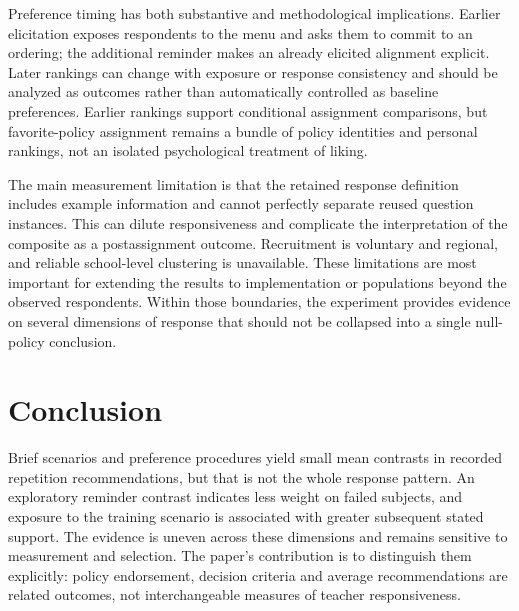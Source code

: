 Preference timing has both substantive and methodological implications. Earlier elicitation exposes respondents to the menu and asks them to commit to an ordering; the additional reminder makes an already elicited alignment explicit. Later rankings can change with exposure or response consistency and should be analyzed as outcomes rather than automatically controlled as baseline preferences. Earlier rankings support conditional assignment comparisons, but favorite-policy assignment remains a bundle of policy identities and personal rankings, not an isolated psychological treatment of liking.


The main measurement limitation is that the retained response definition includes example information and cannot perfectly separate reused question instances. This can dilute responsiveness and complicate the interpretation of the composite as a postassignment outcome. Recruitment is voluntary and regional, and reliable school-level clustering is unavailable. These limitations are most important for extending the results to implementation or populations beyond the observed respondents. Within those boundaries, the experiment provides evidence on several dimensions of response that should not be collapsed into a single null-policy conclusion.

\section{Conclusion}
Brief scenarios and preference procedures yield small mean contrasts in recorded repetition recommendations, but that is not the whole response pattern. An exploratory reminder contrast indicates less weight on failed subjects, and exposure to the training scenario is associated with greater subsequent stated support. The evidence is uneven across these dimensions and remains sensitive to measurement and selection. The paper's contribution is to distinguish them explicitly: policy endorsement, decision criteria and average recommendations are related outcomes, not interchangeable measures of teacher responsiveness.

